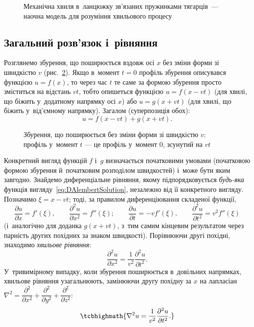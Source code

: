\begin{figure}[h!]\centering
	\caption{Механічна хвиля в~ланцюжку зв'язаних пружинками тягарців~--- наочна модель для
		розуміння хвильового процесу\label{pic:Chain}}
\end{figure}

\subsection*{Загальний розв'язок і~рівняння}

Розглянемо збурення, що поширюється вздовж осі $x$ без зміни форми зі швидкістю $v$ (рис.~\ref{pic:Perturbation}). Якщо в~момент $t=0$ профіль
збурення описувався функцією $u=f(x)$, то через час $t$ те саме за формою збурення просто зміститься на відстань $vt$, тобто опишеться функцією
$u = f(x-vt)$ (для хвилі, що біжить у~додатному напрямку осі $x$) або $u=g(x+vt)$ (для хвилі, що біжить у~від'ємному напрямку). Загалом (суперпозиція обох):
\begin{equation}\label{eq:DAlembertSolution}
	u = f(x-vt) + g(x+vt).
\end{equation}

\begin{figure}[h!]\centering
	\caption{Збурення, що поширюється без зміни форми зі швидкістю $v$: профіль у~момент $t$ ---
		це профіль у~момент $0$, зсунутий на $vt$\label{pic:Perturbation}}
\end{figure}

Конкретний вигляд функцій $f$ і~$g$ визначається початковими умовами (початковою формою збурення й~початковим розподілом швидкостей) і~може бути
яким завгодно. Знайдемо диференціальне рівняння, якому підпорядковується \emph{будь-яка} функція вигляду~\eqref{eq:DAlembertSolution},
незалежно від її конкретного вигляду. Позначимо $\xi = x-vt$; тоді, за правилом диференціювання складеної функції,
\begin{equation*}
	\frac{\partial u}{\partial x} = f'(\xi), \qquad \frac{\partial^2 u}{\partial x^2} = f''(\xi); \qquad \frac{\partial u}{\partial t} = -vf'(\xi),
	\qquad \frac{\partial^2u}{\partial t^2} = v^2f''(\xi)
\end{equation*}
(і~аналогічно для доданка $g(x+vt)$, з~тим самим кінцевим результатом через парність других похідних за знаком швидкості). Порівнюючи другі
похідні, знаходимо \emph{хвильове рівняння}:
\begin{equation}\label{eq:WaveEquation1D}
	\frac{\partial^2 u}{\partial x^2} = \frac1{v^2}\frac{\partial^2u}{\partial t^2}.
\end{equation}
У~тривимірному випадку, коли збурення поширюється в~довільних напрямках, хвильове рівняння узагальнюють, замінюючи другу похідну за $x$ на
лапласіан $\nabla^2 = \dfrac{\partial^2}{\partial x^2}+\dfrac{\partial^2}{\partial y^2}+\dfrac{\partial^2}{\partial z^2}$:
\begin{equation}\label{eq:WaveEquation3D}
	\tcbhighmath{
		\nabla^2 u = \frac1{v^2}\frac{\partial^2u}{\partial t^2}.
	}
\end{equation}

